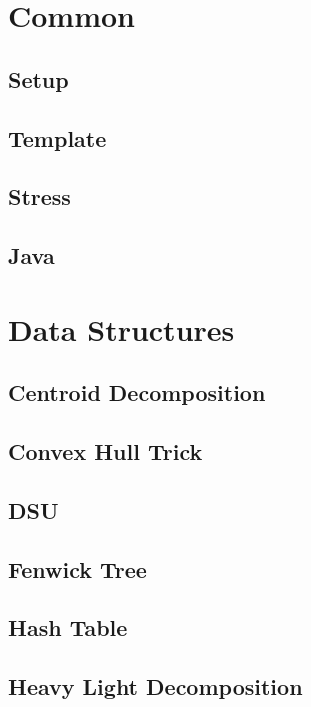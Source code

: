 
\tableofcontents
\clearpage


\section{Common}

\subsection{Setup}

\subsection{Template}

\subsection{Stress}

\subsection{Java}
 


\section{Data Structures}

\subsection{Centroid Decomposition}

\subsection{Convex Hull Trick}

\subsection{DSU}

\subsection{Fenwick Tree}

\subsection{Hash Table}

\subsection{Heavy Light Decomposition}

